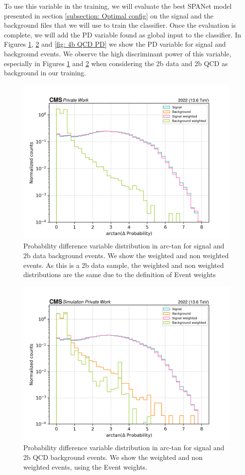 To use this variable in the training, we will evaluate the best SPANet model presented in section \ref{subsection: Optimal config} on the signal and the background files that we will use to train the classifier. Once the evaluation is complete, we will add the PD variable found as global input to the classifier. 
In Figures \ref{fig: 2b data PD}, \ref{fig: 2b QCD PD} and \ref{fig: 4b QCD PD} we show the PD variable for signal and background events. We observe the high discriminant power of this variable, especially in Figures \ref{fig: 2b data PD} and \ref{fig: 2b QCD PD} when considering the 2b data and 2b QCD as background in our training.

\begin{figure}[hbt]
    \centering
    \includegraphics[width=0.7\linewidth]{Images/7.S:B/Prob diff/2b data reduced.png}
    \caption{Probability difference variable distribution in arc-tan for signal and 2b data background events. We show the weighted and non weighted events. As this is a 2b data sample, the weighted and non weighted distributions are the same due to the definition of Event weights}
    \label{fig: 2b data PD}
\end{figure}

\begin{figure}
    \centering
    \includegraphics[width=0.7\linewidth]{Images/7.S:B/Prob diff/2b QCD arctan.png}
    \caption{Probability difference variable distribution in arc-tan for signal and 2b QCD background events. We show the weighted and non weighted events, using the Event weights.}
    \label{fig: 2b QCD PD}
\end{figure}


